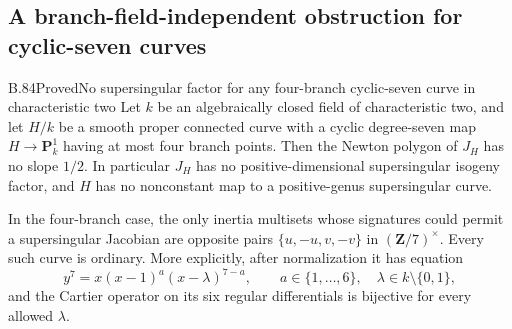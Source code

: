 \subsection{A branch-field-independent obstruction for cyclic-seven curves}

\begin{claim}{B.84}{Proved}{No supersingular factor for any four-branch cyclic-seven curve in characteristic two}
Let $k$ be an algebraically closed field of characteristic two, and
let $H/k$ be a smooth proper connected curve with a cyclic degree-seven
map $H\to\mathbf P^1_k$ having at most four branch points. Then the
Newton polygon of $J_H$ has no slope $1/2$. In particular $J_H$ has
no positive-dimensional supersingular isogeny factor, and $H$ has no
nonconstant map to a positive-genus supersingular curve.

In the four-branch case, the only inertia multisets whose signatures
could permit a supersingular Jacobian are opposite pairs
$\{u,-u,v,-v\}$ in $(\mathbf Z/7)^\times$. Every such curve is
ordinary. More explicitly, after normalization it has equation
\[
 y^7=x(x-1)^a(x-\lambda)^{7-a},\qquad
 a\in\{1,\ldots,6\},\quad \lambda\in k\setminus\{0,1\},
                                                               \tag{B.84.1}
\]
and the Cartier operator on its six regular differentials is
bijective for every allowed $\lambda$.
\end{claim}

